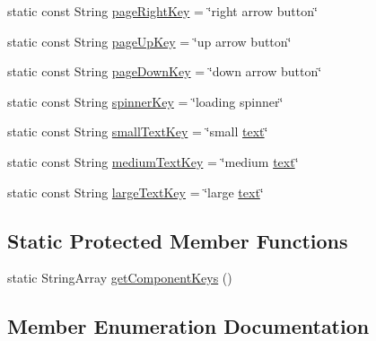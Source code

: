 \begin{DoxyCompactItemize}
\item 
static const String \mbox{\hyperlink{classComponentConfigFile_a776fbf69042134e4bef50674d887b5fe}{page\+Right\+Key}} = \char`\"{}right arrow button\char`\"{}
\item 
static const String \mbox{\hyperlink{classComponentConfigFile_ad633ebb28c7b2794a3ae280c8a27be0c}{page\+Up\+Key}} = \char`\"{}up arrow button\char`\"{}
\item 
static const String \mbox{\hyperlink{classComponentConfigFile_aac4344074e1e037ded90c7b5393bb25c}{page\+Down\+Key}} = \char`\"{}down arrow button\char`\"{}
\item 
static const String \mbox{\hyperlink{classComponentConfigFile_a2dc1970e3a42bc95ed6b19da3c70613a}{spinner\+Key}} = \char`\"{}loading spinner\char`\"{}
\item 
static const String \mbox{\hyperlink{classComponentConfigFile_a1983a2e8d69a256bd25b300a2019da22}{small\+Text\+Key}} = \char`\"{}small \mbox{\hyperlink{classComponentConfigFile_a9bf86058d7f64d6ba94770c3dbf3cad8ac27156a5310c2ff67c46cd3cd629eb70}{text}}\char`\"{}
\item 
static const String \mbox{\hyperlink{classComponentConfigFile_a1f62cbbdd6827681a7e429185b0c56a1}{medium\+Text\+Key}} = \char`\"{}medium \mbox{\hyperlink{classComponentConfigFile_a9bf86058d7f64d6ba94770c3dbf3cad8ac27156a5310c2ff67c46cd3cd629eb70}{text}}\char`\"{}
\item 
static const String \mbox{\hyperlink{classComponentConfigFile_ade34635c596844daae68c87a079ea5fd}{large\+Text\+Key}} = \char`\"{}large \mbox{\hyperlink{classComponentConfigFile_a9bf86058d7f64d6ba94770c3dbf3cad8ac27156a5310c2ff67c46cd3cd629eb70}{text}}\char`\"{}
\end{DoxyCompactItemize}
\subsection*{Static Protected Member Functions}
\begin{DoxyCompactItemize}
\item 
static String\+Array \mbox{\hyperlink{classComponentConfigFile_a5d5fb2db80da161d553e60d0ad16241e}{get\+Component\+Keys}} ()
\end{DoxyCompactItemize}


\subsection{Member Enumeration Documentation}
\mbox{\label{classComponentConfigFile_a9bf86058d7f64d6ba94770c3dbf3cad8}} 
